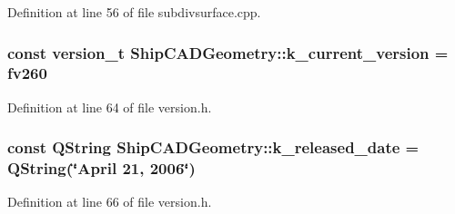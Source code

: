 Definition at line 56 of file subdivsurface.\-cpp.

\hypertarget{namespaceShipCADGeometry_a5c748cd8606fd73ee683752564c7cb8a}{
\subsubsection[{k\-\_\-current\-\_\-version}]{\setlength{\rightskip}{0pt plus 5cm}const {\bf version\-\_\-t} Ship\-C\-A\-D\-Geometry\-::k\-\_\-current\-\_\-version = {\bf fv260}}}\label{namespaceShipCADGeometry_a5c748cd8606fd73ee683752564c7cb8a}


Definition at line 64 of file version.\-h.

\hypertarget{namespaceShipCADGeometry_a2ce14e07ed70bf203837e5b08635731e}{
\subsubsection[{k\-\_\-released\-\_\-date}]{\setlength{\rightskip}{0pt plus 5cm}const Q\-String Ship\-C\-A\-D\-Geometry\-::k\-\_\-released\-\_\-date = Q\-String(\char`\"{}April 21, 2006\char`\"{})}}\label{namespaceShipCADGeometry_a2ce14e07ed70bf203837e5b08635731e}


Definition at line 66 of file version.\-h.

